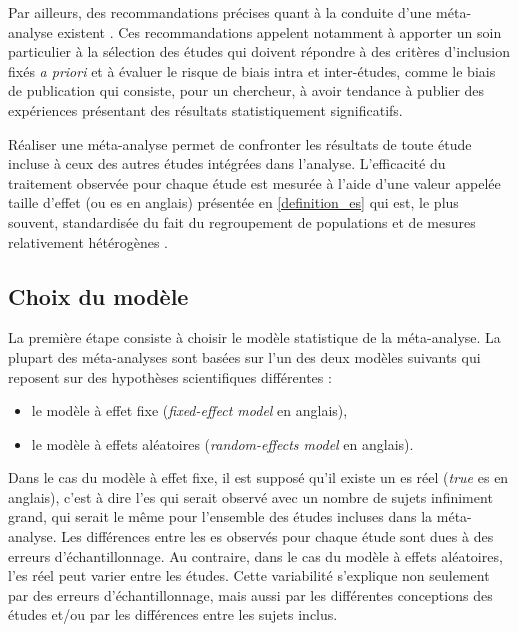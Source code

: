 Par ailleurs, des recommandations précises quant à la conduite d'une méta-analyse existent \citep{Moher2009, Cochrane}. Ces recommandations
appelent notamment à apporter un soin particulier à la sélection des études qui doivent répondre à des critères d'inclusion fixés 
\textit{a priori} et à évaluer le risque de biais intra et inter-études, comme le biais de publication \citep{Higgins2011} qui consiste, 
pour un chercheur, à avoir tendance à publier des expériences présentant des résultats statistiquement significatifs.  

Réaliser une méta-analyse permet de confronter les résultats de toute étude incluse à ceux des autres études intégrées dans l'analyse.
L'efficacité du traitement observée pour chaque étude est mesurée à l'aide d'une valeur appelée taille 
d'effet (ou \gls{es} en anglais) présentée en \ref{definition_es} qui est, le plus souvent, standardisée du fait du regroupement de 
populations et de mesures relativement hétérogènes \citep{Cortese2016}.

\subsection{Choix du modèle} \label{model_choice}

La première étape consiste à choisir le modèle statistique de la méta-analyse. La plupart des méta-analyses sont basées sur l'un des deux modèles 
suivants qui reposent sur des hypothèses scientifiques différentes \citep{Borenstein2009} :
\renewcommand{\labelitemi}{$\bullet$}
\begin{itemize}
\item le modèle à effet fixe (\textit{fixed-effect model} en anglais),
\item le modèle à effets aléatoires (\textit{random-effects model} en anglais).
\end{itemize}

Dans le cas du modèle à effet fixe, il est supposé qu'il existe un \gls{es} réel (\textit{true} \gls{es} en anglais), c'est à dire l'\gls{es} qui serait
observé avec un nombre de sujets infiniment grand, qui serait le même pour l'ensemble des études incluses dans la méta-analyse. Les différences entre
les \gls{es} observés pour chaque étude sont dues à des erreurs d'échantillonnage. Au contraire, dans le cas du modèle à effets aléatoires, 
l'\gls{es} réel peut varier entre les études. Cette variabilité s'explique non seulement par des erreurs d'échantillonnage, mais aussi par 
les différentes conceptions des études et/ou par les différences entre les sujets inclus.

